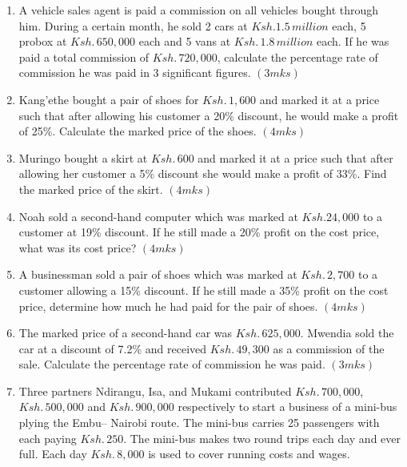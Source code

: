 \documentclass[
  a4paperpaper,
]{scrbook}
\begin{document}
\begin{tcolorbox}
\begin{enumerate}
\def\labelenumi{\arabic{enumi}.}
\setcounter{enumi}{14}
\item
  A vehicle sales agent is paid a commission on all vehicles bought
  through him. During a certain month, he sold 2 cars at
  \(Ksh. 1.5 \,million\) each, 5 probox at \(Ksh.\, 650,000\) each and 5
  vans at \(Ksh.\, 1.8 \,million\) each. If he was paid a total
  commission of \(Ksh.\, 720,000\), calculate the percentage rate of
  commission he was paid in 3 significant figures. \hspace{6.8cm}
  \((3mks)\)
\item
  Kang'ethe bought a pair of shoes for \(Ksh.\, 1,600\) and marked it at
  a price such that after allowing his customer a 20\% discount, he
  would make a profit of 25\%. Calculate the marked price of the shoes.
  \hspace{13.1cm} \((4mks)\)
\item
  Muringo bought a skirt at \(Ksh.\, 600\) and marked it at a price such
  that after allowing her customer a 5\% discount she would make a
  profit of 33\%. Find the marked price of the skirt. \hspace{14.3cm}
  \((4mks)\)
\item
  Noah sold a second-hand computer which was marked at \(Ksh. 24,000\)
  to a customer at 19\% discount. If he still made a 20\% profit on the
  cost price, what was its cost price? \hspace{3cm} \((4mks)\)
\item
  A businessman sold a pair of shoes which was marked at
  \(Ksh.\, 2,700\) to a customer allowing a 15\% discount. If he still
  made a 35\% profit on the cost price, determine how much he had paid
  for the pair of shoes. \hspace{12cm} \((4mks)\)
\item
  The marked price of a second-hand car was \(Ksh.\, 625,000\). Mwendia
  sold the car at a discount of 7.2\% and received \(Ksh.\, 49,300\) as
  a commission of the sale. Calculate the percentage rate of commission
  he was paid. \hspace{10.3cm}\((3mks)\)
\item
  Three partners Ndirangu, Isa, and Mukami contributed
  \(Ksh. \,700,000\), \(Ksh.\, 500,000\) and \(Ksh.\, 900,000\)
  respectively to start a business of a mini-bus plying the Embu--
  Nairobi route. The mini-bus carries 25 passengers with each paying
  \(Ksh.\, 250\). The mini-bus makes two round trips each day and ever
  full. Each day \(Ksh.\, 8,000\) is used to cover running costs and
  wages.


\end{enumerate}
\end{tcolorbox}
\end{document}
